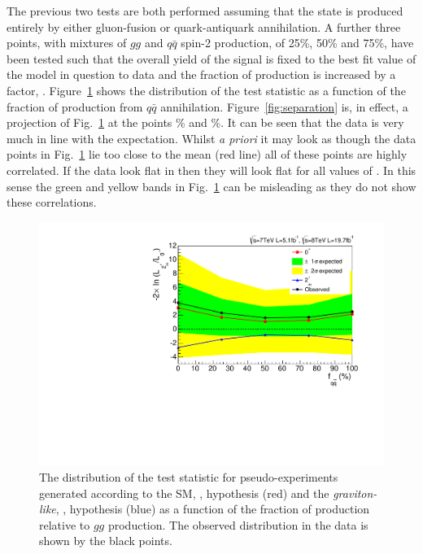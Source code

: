 The previous two tests are both performed assuming that the \twomp state is produced entirely by either gluon-fusion or quark-antiquark annihilation. A further three points, with mixtures of $gg$ and $q\bar{q}$ spin-2 production, of 25\%, 50\% and 75\%, have been tested such that the overall yield of the \twomp signal is fixed to the best fit value of the model in question to data and the fraction of \qqbar production is increased by a factor, \fqqbar. Figure~\ref{fig:qqbar} shows the distribution of the test statistic as a function of the fraction of \twomp production from $q\bar{q}$ annihilation. Figure~\ref{fig:separation} is, in effect, a projection of Fig.~\ref{fig:qqbar} at the points \% and \%. It can be seen that the data is very much in line with the \SM expectation. Whilst \textit{a priori} it may look as though the data points in Fig.~\ref{fig:qqbar} lie too close to the \SM mean (red line) all of these points are highly correlated. If the data look flat in \abscostheta then they will look flat for all values of \fqqbar. In this sense the green and yellow bands in Fig.~\ref{fig:qqbar} can be misleading as they do not show these correlations.

\begin{figure}
  \begin{center}
    \includegraphics[width=0.8\linewidth]{results/plots/fqqbar.pdf}
    \caption[Distribution of the test statistic as a function of \fqqbar for the spin analysis]{The distribution of the test statistic for pseudo-experiments generated according to the SM, \zerop, hypothesis (red) and the \emph{graviton-like}, \twomp, hypothesis (blue) as a function of the fraction of \qqbar production relative to $gg$ production. The observed distribution in the data is shown by the black points.}
    \label{fig:qqbar}
  \end{center}
\end{figure}



